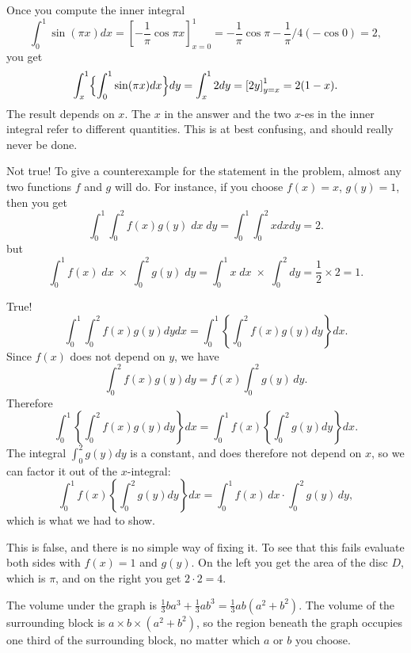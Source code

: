 \item[{\bfseries(VI3.2)}]

Once you compute the inner integral
\[
\int_0^1 \sin(\pi x) dx  = \left[ -\frac1\pi\cos\pi x \right]_{x=0}^1
=-\frac1\pi\cos \pi - \frac1\pi/4 (-\cos 0) = 2,
\]
you get
\[
\int_x^1 \Bigl\{\int_0^1 \sin(\pi x) dx \Bigr\}dy
=\int_x^1 2dy = \left[ 2y \right]_{y=x}^1 = 2(1-x).
\]
The result depends on $x$.  The $x$ in the answer and the two $x$-es
in the inner integral refer to different quantities.  This is at best
confusing, and should really never be done.
\bigskip

\item[{\bfseries(VI3.3a)}]

Not true!
To give a counterexample for the statement in the problem, almost any
two functions $f$ and $g$ will do.  For instance, if you choose $f(x) = x$, $g(y)=1$, then you get
\[
\int_0^1 \int_0^2 f(x) g(y) \; dx\; dy= \int_0^1\int_0^2 xdx dy = 2.
\]
but
\[
\int_0^1 f(x) \; dx\; \times\;
\int_0^2 g(y)\; dy
=
\int_0^1 x \; dx\; \times\;
\int_0^2  dy
=
\frac{1}{2}\times2 = 1.
\]
\bigskip

\item[{\bfseries(VI3.3b)}]

True!
\[
  \int_0^1\int_0^2 f(x)g(y) dy dx
  =\int_0^1\left\{ \int_0^2 f(x)g(y) dy \right\}dx .
\]
Since $f(x)$ does not depend on $y$, we have
\[
\int_0^2 f(x)g(y) dy=f(x) \int_0^2 g(y)\, dy.
\]
Therefore
\[
  \int_0^1\left\{ \int_0^2 f(x)g(y) dy \right\}dx
  =\int_0^1 f(x) \left\{\int_0^2 g(y) dy \right\}dx .
\]
The integral $\int_0^2 g(y)dy$ is a constant, and does therefore not depend on $x$,
so we can factor it out of the $x$-integral:
\[
  \int_0^1 f(x) \left\{\int_0^2 g(y) dy \right\}dx
  = \int_0^1 f(x)\, dx \cdot \int_0^2 g(y)\, dy,
\]
which is what we had to show.
\bigskip

\item[{\bfseries(VI3.3c)}]

This is false, and there is no simple way of fixing it.  To see that this fails
evaluate both sides with $f(x) = 1$ and $g(y)$.  On the left you get the area of
the disc $D$, which is $\pi$, and on the right you get $2\cdot2=4$.
\bigskip

\item[{\bfseries(VI3.4)}]

The volume under the graph is
$\frac13 ba^3 + \frac13 ab^3 = \frac 13 ab(a^2+b^2)$.
The volume of the surrounding block is $a\times b\times (a^2+b^2)$, so
the region beneath the graph occupies one third of the surrounding
block, no matter which $a$ or $b$ you choose.
\bigskip

